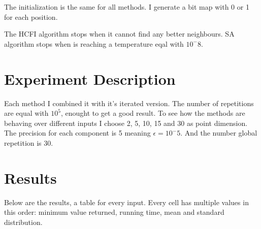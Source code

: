 \documentclass[12pt]{article}
\begin{document}
The initialization is the same for all methods. I generate a bit map with 0 or 1 for each position. 

The HCFI algorithm stops when it cannot find any better neighbours. SA algorithm stops when is reaching a temperature eqal with \( 10^-8 \).


\section{Experiment Description}
Each method I combined it with it's iterated version. The number of repetitions are equal with \( 10^5 \), enought to get a good result. To see how the methods are behaving over different inputs I choose 2, 5, 10, 15 and 30 as point dimension. The precision for each component is 5 meaning \( \epsilon = 10^-5 \).
And the number global repetition is 30.


\section{Results}
Below are the results, a table for every input. Every cell has multiple values in this order: minimum value returned, running time, mean and standard distribution.
\end{document}
